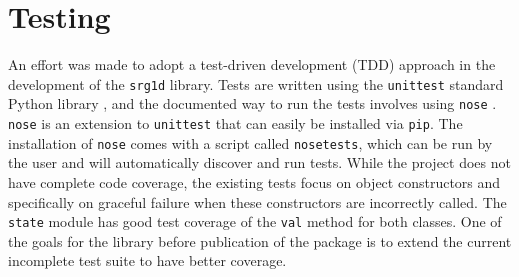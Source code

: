 \section{Testing}

An effort was made to adopt a test-driven development (TDD) approach in the development of the \texttt{srg1d} library. Tests are written using the \texttt{unittest} standard Python library \cite{unittest}, and the documented way to run the tests involves using \texttt{nose} \cite{nose}. \texttt{nose} is an extension to \texttt{unittest} that can easily be installed via \texttt{pip}. The installation of \texttt{nose} comes with a script called \texttt{nosetests}, which can be run by the user and will automatically discover and run tests. While the project does not have complete code coverage, the existing tests focus on object constructors and specifically on graceful failure when these constructors are incorrectly called. The \texttt{state} module has good test coverage of the \texttt{val} method for both classes. One of the goals for the library before publication of the package is to extend the current incomplete test suite to have better coverage.


